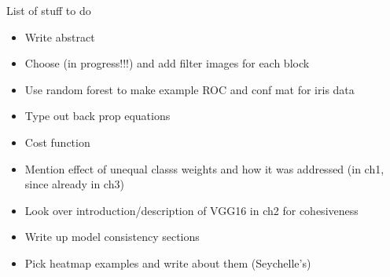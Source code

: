
List of stuff to do

\begin{itemize}
\item Write abstract
\item Choose (in progress!!!) and add filter images for each block
\item Use random forest to make example ROC and conf mat for iris data
\item Type out back prop equations
\item Cost function
\item Mention effect of unequal classs weights and how it was addressed (in ch1, since already in ch3)
\item Look over introduction/description of VGG16 in ch2 for cohesiveness
\item Write up model consistency sections
\item Pick heatmap examples and write about them (Seychelle's)
\end{itemize}

